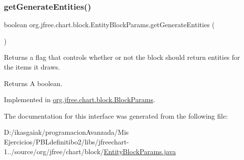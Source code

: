 \subsubsection{\texorpdfstring{get\+Generate\+Entities()}{getGenerateEntities()}}
{\footnotesize\ttfamily boolean org.\+jfree.\+chart.\+block.\+Entity\+Block\+Params.\+get\+Generate\+Entities (\begin{DoxyParamCaption}{ }\end{DoxyParamCaption})}

Returns a flag that controls whether or not the block should return entities for the items it draws.

\begin{DoxyReturn}{Returns}
A boolean. 
\end{DoxyReturn}


Implemented in \mbox{\hyperlink{classorg_1_1jfree_1_1chart_1_1block_1_1_block_params_a5e6834d032c280d81a98ce45f615d231}{org.\+jfree.\+chart.\+block.\+Block\+Params}}.



The documentation for this interface was generated from the following file\+:\begin{DoxyCompactItemize}
\item 
D\+:/ikasgaiak/programacion\+Avanzada/\+Mis Ejercicios/\+P\+B\+Ldefinitibo2/libs/jfreechart-\/1../source/org/jfree/chart/block/\mbox{\hyperlink{_entity_block_params_8java}{Entity\+Block\+Params.\+java}}\end{DoxyCompactItemize}
